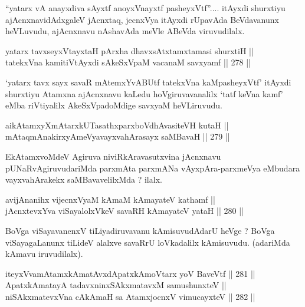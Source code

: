 \begin{artha}
``yatarx vA anayxdiva sAyxtf anoyxV\s nayxtf pasheyxVtf''.... itAyxdi shurxtiyu ajAcnxnavidAdxgaleV jAcnxtaq, jecnxVya
itAyxdi rUpavAda BeVdavanunx heVLuvudu, ajAcnxnavu nAshavAda meVle ABeVda viruvudilalx.
\end{artha}


\begin{shl}
yatarx tavxseyxVtayxtaH pArxha dhavxsAtxtamxtamasi shurxtiH || \\
tatekxVna kamitiVtAyxdi sAkeSxVpaM vacanaM savxyamf ||  278 ||   
\end{shl}

\begin{artha}
`yatarx tavx sayx savaR mAtemxYvABUtf tatekxVna kaMpasheyxVtf' itAyxdi shurxtiyu Atamxna ajAcnxnavu kaLedu hoVgiruvavanalilx
`tatf keVna kamf' eMba riVtiyalilx AkeSxVpadoMdige savxyaM heVLiruvudu.
\end{artha}


\begin{shl}
aikAtamxyXmAtarxkUTasathxparxboVdhAvasiteVH kutaH || \\
mAtaqmAnakirxyAmeVyavayxvahArasayx saMBavaH ||  279 ||  
\end{shl}

\begin{artha}
EkAtamxvoMdeV Agiruva niviRkAravasutxvina jAcnxnavu
pUNaRvAgiruvudariMda parxmAta parxmANa vAyxpAra-parxmeVya eMbudara
vayxvahArakekx saMBavavelilxMda ? ilalx.
\end{artha}


\begin{shl}
avijAnanihx vijecnxVyaM kAmaM kAmayateV kathamf || \\
jAcnxtevxYva viSayalolxVkeV savaRH kAmayateV yataH ||  280 ||  
\end{shl}

\begin{artha}
BoVga viSayavanenxV tiLiyadiruvavanu kAmisuvudAdarU heVge ? BoVga
viSayagaLanunx tiLideV alalxve savaRrU loVkadalilx kAmisuvudu.
(adariMda kAmavu iruvudilalx).
\end{artha}

\begin{shl}
iteyxVvamAtamxkAmatAvxdApatxkAmoV\s tarx yoV BaveVtf ||  281 ||  \\
ApatxkAmatayA tadavxninxSAkxmatavxM samushunxteV || \\
niSAkxmatevxVna cAkAmaH sa AtamxjocnxV vimucayxteV ||  282 ||  
\end{shl}

